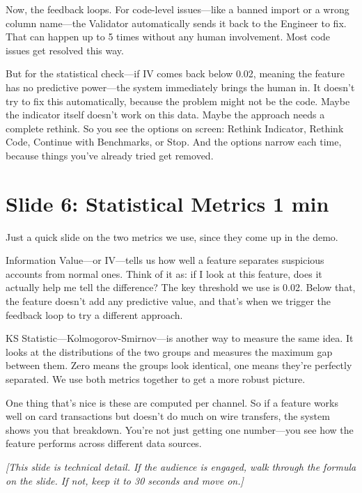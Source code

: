 \documentclass[11pt, a4paper]{article}
\newcommand{\note}[1]{\par{\small\color{note}\textit{[#1]}}\par}
\newcommand{\timing}[1]{{\hfill\small\color{gray}#1}}
\begin{document}
Now, the feedback loops. For code-level issues---like a banned import or a wrong column name---the Validator automatically sends it back to the Engineer to fix. That can happen up to 5 times without any human involvement. Most code issues get resolved this way.

But for the statistical check---if IV comes back below 0.02, meaning the feature has no predictive power---the system immediately brings the human in. It doesn't try to fix this automatically, because the problem might not be the code. Maybe the indicator itself doesn't work on this data. Maybe the approach needs a complete rethink. So you see the options on screen: Rethink Indicator, Rethink Code, Continue with Benchmarks, or Stop. And the options narrow each time, because things you've already tried get removed.

\section{Slide 6: Statistical Metrics \timing{1 min}}

Just a quick slide on the two metrics we use, since they come up in the demo.

Information Value---or IV---tells us how well a feature separates suspicious accounts from normal ones. Think of it as: if I look at this feature, does it actually help me tell the difference? The key threshold we use is 0.02. Below that, the feature doesn't add any predictive value, and that's when we trigger the feedback loop to try a different approach.

KS Statistic---Kolmogorov-Smirnov---is another way to measure the same idea. It looks at the distributions of the two groups and measures the maximum gap between them. Zero means the groups look identical, one means they're perfectly separated. We use both metrics together to get a more robust picture.

One thing that's nice is these are computed per channel. So if a feature works well on card transactions but doesn't do much on wire transfers, the system shows you that breakdown. You're not just getting one number---you see how the feature performs across different data sources.

\note{This slide is technical detail. If the audience is engaged, walk through the formula on the slide. If not, keep it to 30 seconds and move on.}
\end{document}
